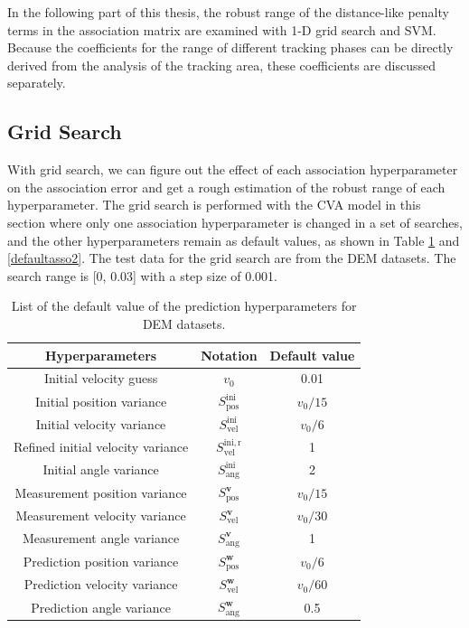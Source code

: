 In the following part of this thesis, the robust range of the distance-like penalty terms in the association matrix are examined with 1-D grid search and SVM. Because the coefficients for the range of different tracking phases can be directly derived from the analysis of the tracking area, these coefficients are discussed separately.


\subsection{Grid Search}
With grid search, we can figure out the effect of each association hyperparameter on the association error and get a rough estimation of the robust range of each hyperparameter. The grid search is performed with the CVA model in this section where only one association hyperparameter is changed in a set of searches, and the other hyperparameters remain as default values, as shown in Table \ref{defaultCVA2} and \ref{defaultasso2}. The test data for the grid search are from the DEM datasets. The search range is [0, 0.03] with a step size of 0.001.




\begin{table}[htbp] 
    \centering
    \caption{List of the default value of the prediction hyperparameters for DEM datasets.} 
    \begin{tabular}{ccc} 
    \toprule 
    Hyperparameters&Notation& Default value\\ 
    \midrule 
    Initial velocity guess              &$v_{0}$&0.01\\
    Initial position variance           &$S_{\mathrm{pos}}^{\mathrm{ini}}$&$v_{0}/15$\\
    Initial velocity variance           &$S_{\mathrm{vel}}^{\mathrm{ini}}$&$v_{0}/6$\\
    Refined initial velocity variance   &$S_{\mathrm{vel}}^{\mathrm{ini, r}}$&1\\
    Initial angle variance              &$S_{\mathrm{ang}}^{\mathrm{ini}}$&2\\
    Measurement position variance       &$S_{\mathrm{pos}}^{\boldsymbol{v}}$&$v_{0}/15$\\
    Measurement velocity variance       &$S_{\mathrm{vel}}^{\boldsymbol{v}}$&$v_{0}/30$\\
    Measurement angle variance          &$S_{\mathrm{ang}}^{\boldsymbol{v}}$&1\\
    Prediction position variance        &$S_{\mathrm{pos}}^{\boldsymbol{w}}$&$v_{0}/6$\\
    Prediction velocity variance        &$S_{\mathrm{vel}}^{\boldsymbol{w}}$&$v_{0}/60$\\
    Prediction angle variance           &$S_{\mathrm{ang}}^{\boldsymbol{w}}$&0.5\\
    \bottomrule 
    \end{tabular} 
    \label{defaultCVA2}
\end{table}


